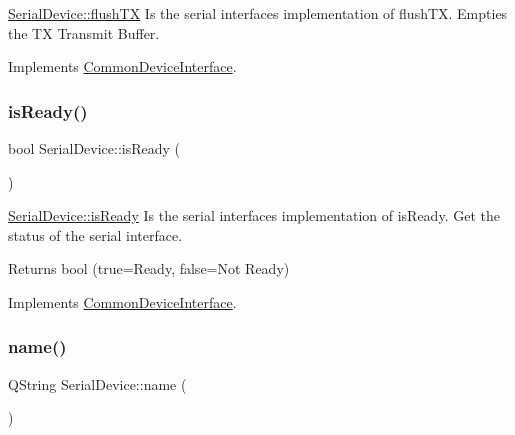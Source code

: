 \hyperlink{class_serial_device_a56d7c575161fd216821d06e25f37106c}{Serial\+Device\+::flush\+TX} Is the serial interface\textquotesingle{}s implementation of flush\+TX. Empties the TX Transmit Buffer. 



Implements \hyperlink{class_common_device_interface_a45edc68596f002f0765740ee14b39b77}{Common\+Device\+Interface}.

\hypertarget{class_serial_device_aa2435fb76a612b2ebf1a61287deee85d}{}\label{class_serial_device_aa2435fb76a612b2ebf1a61287deee85d} 
\subsubsection{\texorpdfstring{is\+Ready()}{isReady()}}
{\footnotesize\ttfamily bool Serial\+Device\+::is\+Ready (\begin{DoxyParamCaption}{ }\end{DoxyParamCaption})\hspace{0.3cm}{\ttfamily [virtual]}}



\hyperlink{class_serial_device_aa2435fb76a612b2ebf1a61287deee85d}{Serial\+Device\+::is\+Ready} Is the serial interface\textquotesingle{}s implementation of is\+Ready. Get the status of the serial interface. 

\begin{DoxyReturn}{Returns}
bool (true=Ready, false=Not Ready) 
\end{DoxyReturn}


Implements \hyperlink{class_common_device_interface_ae58207ead16a77fa94babe01f0a3ba40}{Common\+Device\+Interface}.

\hypertarget{class_serial_device_a97092ec9379ed561866dad21475ea331}{}\label{class_serial_device_a97092ec9379ed561866dad21475ea331} 
\subsubsection{\texorpdfstring{name()}{name()}}
{\footnotesize\ttfamily Q\+String Serial\+Device\+::name (\begin{DoxyParamCaption}{ }\end{DoxyParamCaption})\hspace{0.3cm}{\ttfamily [virtual]}}



